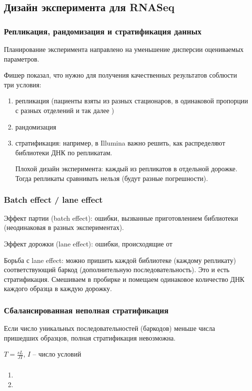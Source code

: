 \documentclass[main.tex]{subfiles}
\begin{document}
\subsection{Дизайн эксперимента для RNASeq}
\subsubsection{Репликация, рандомизация и стратификация данных}

Планирование эксперимента направлено на уменьшение дисперсии оцениваемых параметров.

Фишер показал, что нужно для получения качественных результатов соблюсти три условия:

\begin{enumerate}[noitemsep]
    \item репликация (пациенты взяты из разных стационаров, в одинаковой пропорции с разных отделений и так далее )
    \item рандомизация
    \item стратификация: например, в Illumina важно решить, как распределяют библиотеки ДНК по репликатам.

    Плохой дизайн эксперимента: каждый из репликатов в отдельной дорожке.
    Тогда репликаты сравнивать нельзя (будут разные погрешности).

\end{enumerate}

\subsubsection{Batch effect / lane effect}

Эффект партии (batch effect): ошибки, вызванные приготовлением библиотеки (неодинаковая в разных экспериментах).

Эффект дорожки (lane effect):
ошибки, происходящие от %

Борьба с lane effect: можно пришить каждой библиотеке (каждому репликату) соответствующий баркод (дополнительную последовательность).
Это и есть стратификация.
Смешиваем в пробирке и помещаем одинаковое количество ДНК каждого образца в каждую дорожку.

\subsubsection{Сбалансированная неполная стратификация}

Если число уникальных последовательностей (баркодов) меньше числа пришедших образцов, полная стратификация невозможна.


$ T = \frac{sL}{JI} $, $I$ -- число условий

\subsubsection{}

\begin{enumerate}[noitemsep]
    \item
    \item
\end{enumerate}
\end{document}
